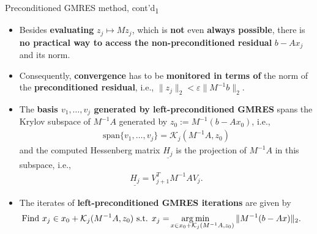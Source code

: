 \documentclass[t,usepdftitle=false]{beamer}
\begin{document}
\begin{frame}{Preconditioned GMRES method, cont'd\textsubscript{1}}
\begin{itemize}
\item Besides \textbf{evaluating} $z_j\mapsto Mz_j$, which is \textbf{not} even \textbf{always possible}, there is \textbf{no practical way to access the non-preconditioned residual} $b-Ax_j$ and its norm.
\item[] Consequently, \textbf{convergence} has to be \textbf{monitored in terms of} the norm of the \textbf{preconditioned residual}, i.e., $\|z_j\|_2<\varepsilon\|M^{-1}b\|_2$.
\item The \textbf{basis $v_1,\dots,v_j$ generated by left-preconditioned GMRES} spans the Krylov subspace of $M^{-1}A$ generated by $z_0:=M^{-1}(b-Ax_0)$, i.e.,
\begin{align*}
\text{span}\{v_1,\dots,v_j\}=\mathcal{K}_j(M^{-1}A,z_0)
\end{align*}
and the computed Hessenberg matrix $\underline{H_j}$ is the projection of $M^{-1}A$ in this subspace, i.e.,
\begin{align*}
\underline{H_j}=V_{j+1}^TM^{-1}AV_j.
\end{align*}
\item The iterates of \textbf{left-preconditioned GMRES iterations} are given by
\begin{align*}
\hspace{-.4cm}
\text{Find }
x_j\in x_0+\mathcal{K}_j(M^{-1}A,z_0)
\text{ s.t. }
x_j=\hspace{.4cm}\arg\hspace{-1cm}\min_{x\in x_0+\mathcal{K}_j(M^{-1}A, z_0)}\|M^{-1}(b-Ax)\|_2.
\end{align*}
\end{itemize}
\end{frame}
\end{document}
